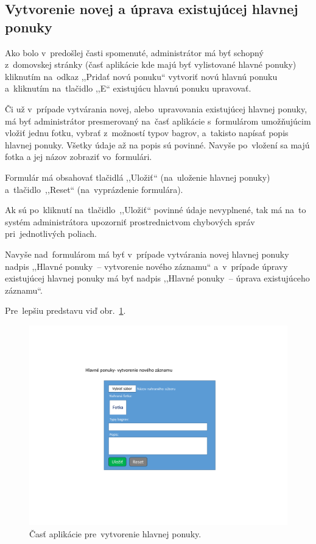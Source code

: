 \subsection{Vytvorenie novej a úprava existujúcej hlavnej ponuky}

Ako bolo v~predošlej časti spomenuté, administrátor má byť schopný z~domovskej stránky (časť aplikácie kde majú byť vylistované hlavné ponuky) kliknutím na~odkaz ,,Pridať novú ponuku`` vytvoriť novú hlavnú ponuku a~kliknutím na~tlačidlo ,,E`` existujúcu hlavnú ponuku upravovať.

Či už v~prípade vytvárania novej, alebo~upravovania existujúcej hlavnej ponuky, má byť administrátor presmerovaný na~časť aplikácie s~formulárom umožňujúcim vložiť jednu fotku, vybrať z~možností typov bagrov, a~takisto napísať popis hlavnej ponuky. Všetky údaje až na popis sú povinné. Navyše po~vložení sa majú fotka a jej názov zobraziť vo~formulári.

Formulár má obsahovať tlačidlá ,,Uložiť`` (na~uloženie hlavnej ponuky) a~tlačidlo~,,Reset`` (na~vyprázdenie formulára).

Ak sú po~kliknutí na~tlačidlo~,,Uložiť`` povinné údaje nevyplnené, tak má na~to systém administrátora upozorniť prostrednictvom chybových správ pri~jednotlivých poliach.

Navyše nad~formulárom má byť v~prípade vytvárania novej hlavnej ponuky nadpis ,,Hlavné ponuky~-- vytvorenie nového záznamu`` a~v~prípade úpravy existujúcej hlavnej ponuky má byť nadpis ,,Hlavné ponuky~-- úprava existujúceho záznamu``.

Pre~lepšiu predstavu viď obr.~\ref{main offer form}.

\begin{figure}[H]\centering
\includegraphics[width=140mm]{../img/UI concept/main offer form}
\caption{Časť aplikácie pre~vytvorenie hlavnej ponuky.}
\label{main offer form}
\end{figure}

